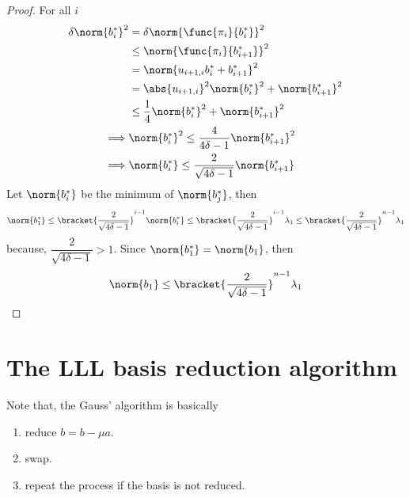  \begin{proof}
    For all \(i\)
    \begin{align*}
        \delta \norm{b_i^{\ast}}^2 &= \delta \norm{\func{\pi_i}{b_i^{\ast}}}^2 \\
        &\leq \norm{\func{\pi_i}{b_{i + 1}^{\ast}}}^2\\
        &= \norm{u_{i+1,i} b_i^{\ast} + b_{i + 1}^{\ast}}^2\\
        &= \abs{u_{i+1,i}}^2 \norm{b_i^{\ast}}^2 + \norm{b_{i + 1}^{\ast}}^2\\
        &\leq \frac{1}{4} \norm{b_i^{\ast}}^2 + \norm{b_{i + 1}^{\ast}}^2\\
        \implies& \norm{b_i^{\ast}}^2 \leq \dfrac{4}{4\delta - 1} \norm{b_{i + 1}^{\ast}}^2\\
        \implies& \norm{b_i^{\ast}} \leq \dfrac{2}{\sqrt{4\delta - 1}} \norm{b_{i + 1}^{\ast}}
    \end{align*}
    Let \(\norm{b_i^{\ast}}\) be the minimum of \(\norm{b_j^{\ast}}\), then 
    \begin{equation*}
        \norm{b_1^{\ast}} \leq \bracket{\dfrac{2}{\sqrt{4\delta - 1}}}^{i-1}  \norm{b_{i}^{\ast}} \leq \bracket{\dfrac{2}{\sqrt{4\delta - 1}}}^{i-1}  \lambda_1 \leq \bracket{\dfrac{2}{\sqrt{4\delta - 1}}}^{n-1}  \lambda_1
    \end{equation*}
    because, \(\dfrac{2}{\sqrt{4\delta - 1}} > 1\). Since \(\norm{b_1^{\ast}} = \norm{b_1}\), then 
    \begin{equation*}
        \norm{b_1} \leq \bracket{\dfrac{2}{\sqrt{4\delta - 1}}}^{n-1}  \lambda_1
    \end{equation*}
 \end{proof}
 \section{The LLL basis reduction algorithm}
 Note that, the Gauss' algorithm is basically 
 \begin{enumerate}
    \item reduce \(b = b - \mu a\).
    \item swap.
    \item repeat the process if the basis is not reduced.
 \end{enumerate}

